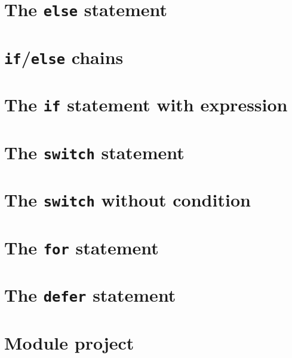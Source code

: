 \documentclass[]{book}
\begin{document}
\hypertarget{the-else-statement}{%
\section{\texorpdfstring{The \texttt{else} statement}{The else statement}}\label{the-else-statement}}

\hypertarget{ifelse-chains}{%
\section{\texorpdfstring{\texttt{if}/\texttt{else} chains}{if/else chains}}\label{ifelse-chains}}

\hypertarget{the-if-statement-with-expression}{%
\section{\texorpdfstring{The \texttt{if} statement with expression}{The if statement with expression}}\label{the-if-statement-with-expression}}

\hypertarget{the-switch-statement}{%
\section{\texorpdfstring{The \texttt{switch} statement}{The switch statement}}\label{the-switch-statement}}

\hypertarget{the-switch-without-condition}{%
\section{\texorpdfstring{The \texttt{switch} without condition}{The switch without condition}}\label{the-switch-without-condition}}

\hypertarget{the-for-statement}{%
\section{\texorpdfstring{The \texttt{for} statement}{The for statement}}\label{the-for-statement}}

\hypertarget{the-defer-statement}{%
\section{\texorpdfstring{The \texttt{defer} statement}{The defer statement}}\label{the-defer-statement}}

\hypertarget{module-project-1}{%
\section*{Module project}\label{module-project-1}}
\end{document}
